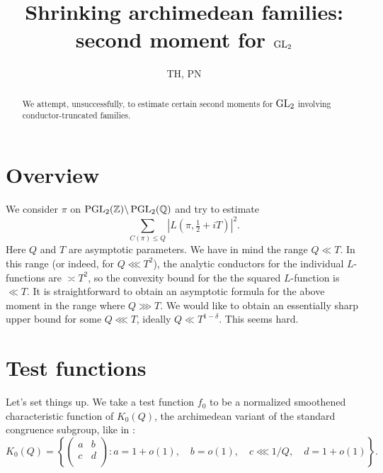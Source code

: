 \documentclass[reqno]{amsart} 
\title{Shrinking archimedean families: second moment for $\operatorname{GL}_2$}
\author{TH, PN}
\begin{document}
\maketitle
\tableofcontents

\begin{abstract}
  We attempt, unsuccessfully, to estimate certain second moments for $\operatorname{GL}_2$ involving conductor-truncated families.
\end{abstract}

\section{Overview}\label{sec:20230522180023}
We consider $\pi $ on $\operatorname{PGL}_2(\mathbb{Z}) \backslash \operatorname{PGL}_2(\mathbb{Q})$ and try to estimate
\begin{equation*}
\sum_{C(\pi) \leq Q} \left\lvert L (\pi, \tfrac{1}{2} + i T ) \right\rvert^2.
\end{equation*}
Here $Q$ and $T$ are asymptotic parameters.  We have in mind the range $Q \ll T$.  In this range (or indeed, for $Q \lll T^2$), the analytic conductors for the individual $L$-functions are $\asymp T^2$, so the convexity bound for the the squared $L$-function is $\ll T$.  It is straightforward to obtain an asymptotic formula for the above moment in the range where $Q \ggg T$.  We would like to obtain an essentially sharp upper bound for some $Q \lll T$, ideally $Q \ll T^{1-\delta}$.  This seems hard.

\section{Test functions}\label{sec:20230522180025}
Let's set things up.  We take a test function $f_0$ to be a normalized smoothened characteristic function of $K_0(Q)$, the archimedean variant of the standard congruence subgroup, like in \cite{JN19a}:
\begin{equation*}
  K_0(Q)
  = \left\{
    \begin{pmatrix}
a & b \\
c & d \\
    \end{pmatrix}
    :
    a = 1 + o(1), \quad
    b = o(1),
    \quad
    c \lll 1/Q,
    \quad
    d = 1 + o(1)
  \right\}.
\end{equation*}
\end{document}

